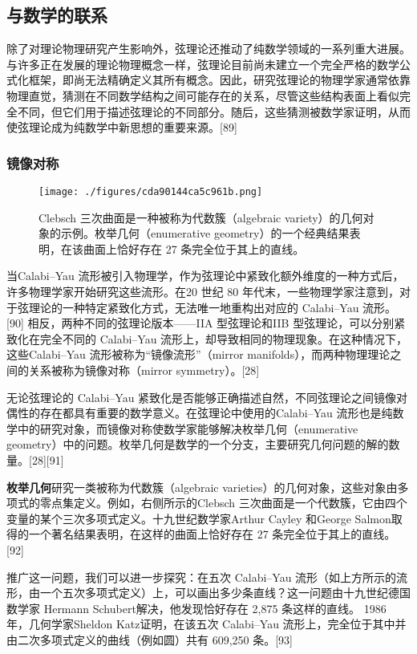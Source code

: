 \subsection{与数学的联系}
除了对理论物理研究产生影响外，弦理论还推动了纯数学领域的一系列重大进展。与许多正在发展的理论物理概念一样，弦理论目前尚未建立一个完全严格的数学公式化框架，即尚无法精确定义其所有概念。因此，研究弦理论的物理学家通常依靠物理直觉，猜测在不同数学结构之间可能存在的关系，尽管这些结构表面上看似完全不同，但它们用于描述弦理论的不同部分。随后，这些猜测被数学家证明，从而使弦理论成为纯数学中新思想的重要来源。[89]
\subsubsection{镜像对称}
\begin{figure}[ht]
\centering
\texttt{[image: ./figures/cda90144ca5c961b.png]}
\caption{Clebsch 三次曲面是一种被称为代数簇（algebraic variety）的几何对象的示例。枚举几何（enumerative geometry）的一个经典结果表明，在该曲面上恰好存在 27 条完全位于其上的直线。} \label{fig_String_11}
\end{figure}
当Calabi–Yau 流形被引入物理学，作为弦理论中紧致化额外维度的一种方式后，许多物理学家开始研究这些流形。在20 世纪 80 年代末，一些物理学家注意到，对于弦理论的一种特定紧致化方式，无法唯一地重构出对应的 Calabi–Yau 流形。[90] 相反，两种不同的弦理论版本——IIA 型弦理论和IIB 型弦理论，可以分别紧致化在完全不同的 Calabi–Yau 流形上，却导致相同的物理现象。在这种情况下，这些Calabi–Yau 流形被称为“镜像流形”（mirror manifolds），而两种物理理论之间的关系被称为镜像对称（mirror symmetry）。[28]

无论弦理论的 Calabi–Yau 紧致化是否能够正确描述自然，不同弦理论之间镜像对偶性的存在都具有重要的数学意义。在弦理论中使用的Calabi–Yau 流形也是纯数学中的研究对象，而镜像对称使数学家能够解决枚举几何（enumerative geometry）中的问题。枚举几何是数学的一个分支，主要研究几何问题的解的数量。[28][91]

\textbf{枚举几何}研究一类被称为代数簇（algebraic varieties）的几何对象，这些对象由多项式的零点集定义。例如，右侧所示的Clebsch 三次曲面是一个代数簇，它由四个变量的某个三次多项式定义。十九世纪数学家Arthur Cayley 和George Salmon取得的一个著名结果表明，在这样的曲面上恰好存在 27 条完全位于其上的直线。[92]  

推广这一问题，我们可以进一步探究：在五次 Calabi–Yau 流形（如上方所示的流形，由一个五次多项式定义）上，可以画出多少条直线？这一问题由十九世纪德国数学家 Hermann Schubert解决，他发现恰好存在 2,875 条这样的直线。 1986 年，几何学家Sheldon Katz证明，在该五次 Calabi–Yau 流形上，完全位于其中并由二次多项式定义的曲线（例如圆）共有 609,250 条。[93]

